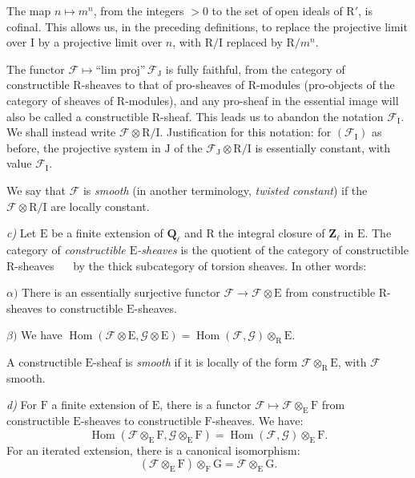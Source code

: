 \documentclass[11pt,leqno]{article}
\newcommand{\Page}[1]{\ifvmode\noindent\else\unskip\ \fi{\footnotesize\textcolor{gray}{[p.\,#1]}}\ \ignorespaces}
\begin{document}
The map \(n\mapsto m^n\), from the integers \(>0\) to the set of open ideals of \(\mathrm{R}'\), is cofinal. This allows us, in the preceding definitions, to replace the projective limit over \(\mathrm{I}\) by a projective limit over \(n\), with \(\mathrm{R}/\mathrm{I}\) replaced by \(\mathrm{R}/m^n\).

The functor \(\mathscr{F}\mapsto\text{“lim proj”}\,\mathscr{F}_{\mathrm{J}}\) is fully faithful, from the category of constructible \(\mathrm{R}\)-sheaves to that of pro-sheaves of \(\mathrm{R}\)-modules (pro-objects of the category of sheaves of \(\mathrm{R}\)-modules), and any pro-sheaf in the essential image will also be called a constructible \(\mathrm{R}\)-sheaf. This leads us to abandon the notation \(\mathscr{F}_{\mathrm{I}}\). We shall instead write \(\mathscr{F}\otimes\mathrm{R}/\mathrm{I}\). Justification for this notation: for \((\mathscr{F}_{\mathrm{I}})\) as before, the projective system in \(\mathrm{J}\) of the \(\mathscr{F}_{\mathrm{J}}\otimes\mathrm{R}/\mathrm{I}\) is essentially constant, with value \(\mathscr{F}_{\mathrm{I}}\).

We say that \(\mathscr{F}\) is \textit{smooth} (in another terminology, \textit{twisted constant}) if the \(\mathscr{F}\otimes\mathrm{R}/\mathrm{I}\) are locally constant.

\textit{c)} Let \(\mathrm{E}\) be a finite extension of \(\mathbf{Q}_\ell\) and \(\mathrm{R}\) the integral closure of \(\mathbf{Z}_\ell\) in \(\mathrm{E}\). The category of \textit{constructible \(\mathrm{E}\)-sheaves} is the quotient of the category of constructible \(\mathrm{R}\)-sheaves \Page{147}
by the thick subcategory of torsion sheaves. In other words:

\noindent \(\alpha)\) There is an essentially surjective functor \(\mathscr{F}\to\mathscr{F}\otimes\mathrm{E}\) from constructible \(\mathrm{R}\)-sheaves to constructible \(\mathrm{E}\)-sheaves.

\noindent \(\beta)\) We have \(\operatorname{Hom}(\mathscr{F}\otimes\mathrm{E},\mathscr{G}\otimes\mathrm{E})=\operatorname{Hom}(\mathscr{F},\mathscr{G})\otimes_{\mathrm{R}}\mathrm{E}\).

A constructible \(\mathrm{E}\)-sheaf is \textit{smooth} if it is locally of the form \(\mathscr{F}\otimes_{\mathrm{R}}\mathrm{E}\), with \(\mathscr{F}\) smooth.

\textit{d)} For \(\mathrm{F}\) a finite extension of \(\mathrm{E}\), there is a functor \(\mathscr{F}\mapsto\mathscr{F}\otimes_{\mathrm{E}}\mathrm{F}\) from constructible \(\mathrm{E}\)-sheaves to constructible \(\mathrm{F}\)-sheaves. We have:
\[
\operatorname{Hom}(\mathscr{F}\otimes_{\mathrm{E}}\mathrm{F},\mathscr{G}\otimes_{\mathrm{E}}\mathrm{F})
=\operatorname{Hom}(\mathscr{F},\mathscr{G})\otimes_{\mathrm{E}}\mathrm{F}.
\]
For an iterated extension, there is a canonical isomorphism:
\[
(\mathscr{F}\otimes_{\mathrm{E}}\mathrm{F})\otimes_{\mathrm{F}}\mathrm{G}
=\mathscr{F}\otimes_{\mathrm{E}}\mathrm{G}.
\tag*{(1)}
\]
\end{document}

